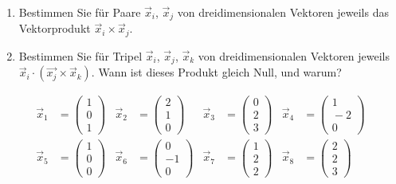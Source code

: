 \begin{enumerate}
\item Bestimmen Sie für Paare $\vec{x}_i$, $\vec{x}_j$ von dreidimensionalen Vektoren jeweils das Vektorprodukt $\vec{x}_i\times\vec{x}_j$.
\item Bestimmen Sie für Tripel $\vec{x}_i$, $\vec{x}_j$, $\vec{x}_k$ von dreidimensionalen Vektoren jeweils $\vec{x}_i\cdot(\vec{x_j}\times\vec{x}_k)$. Wann ist dieses Produkt gleich Null, und warum?
\end{enumerate}
\begin{align*}
\vec{x}_1&=\left(\begin{array}{c}1\\0\\1\end{array}\right)
&\vec{x}_2&=\left(\begin{array}{c}2\\1\\0\end{array}\right)
&\vec{x}_3&=\left(\begin{array}{c}0\\2\\3\end{array}\right)
&\vec{x}_4&=\left(\begin{array}{c}1\\{}-2\\0\end{array}\right)\\
\vec{x}_5&=\left(\begin{array}{c}1\\0\\0\end{array}\right)
&\vec{x}_6&=\left(\begin{array}{c}0\\-1\\0\end{array}\right)
&\vec{x}_7&=\left(\begin{array}{c}1\\2\\2\end{array}\right)
&\vec{x}_8&=\left(\begin{array}{c}2\\2\\3\end{array}\right)\\
\end{align*}


\pagebreak



